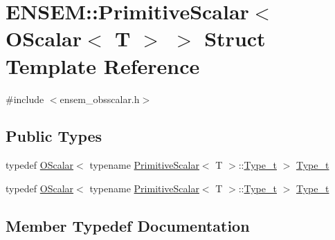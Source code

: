 \hypertarget{structENSEM_1_1PrimitiveScalar_3_01OScalar_3_01T_01_4_01_4}{}\section{E\+N\+S\+EM\+:\+:Primitive\+Scalar$<$ O\+Scalar$<$ T $>$ $>$ Struct Template Reference}
\label{structENSEM_1_1PrimitiveScalar_3_01OScalar_3_01T_01_4_01_4}


{\ttfamily \#include $<$ensem\+\_\+obsscalar.\+h$>$}

\subsection*{Public Types}
\begin{DoxyCompactItemize}
\item 
typedef \mbox{\hyperlink{classENSEM_1_1OScalar}{O\+Scalar}}$<$ typename \mbox{\hyperlink{structENSEM_1_1PrimitiveScalar}{Primitive\+Scalar}}$<$ T $>$\+::\mbox{\hyperlink{structENSEM_1_1PrimitiveScalar_3_01OScalar_3_01T_01_4_01_4_a04f9a62c0498189e4c514dce6a7baa36}{Type\+\_\+t}} $>$ \mbox{\hyperlink{structENSEM_1_1PrimitiveScalar_3_01OScalar_3_01T_01_4_01_4_a04f9a62c0498189e4c514dce6a7baa36}{Type\+\_\+t}}
\item 
typedef \mbox{\hyperlink{classENSEM_1_1OScalar}{O\+Scalar}}$<$ typename \mbox{\hyperlink{structENSEM_1_1PrimitiveScalar}{Primitive\+Scalar}}$<$ T $>$\+::\mbox{\hyperlink{structENSEM_1_1PrimitiveScalar_3_01OScalar_3_01T_01_4_01_4_a04f9a62c0498189e4c514dce6a7baa36}{Type\+\_\+t}} $>$ \mbox{\hyperlink{structENSEM_1_1PrimitiveScalar_3_01OScalar_3_01T_01_4_01_4_a04f9a62c0498189e4c514dce6a7baa36}{Type\+\_\+t}}
\end{DoxyCompactItemize}


\subsection{Member Typedef Documentation}
\mbox{\label{structENSEM_1_1PrimitiveScalar_3_01OScalar_3_01T_01_4_01_4_a04f9a62c0498189e4c514dce6a7baa36}} 
